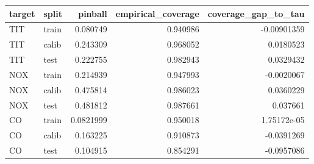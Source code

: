 \begin{tabular}{llrrr}
\toprule
target & split & pinball & empirical\_coverage & coverage\_gap\_to\_tau \\
\midrule
TIT & train & 0.080749 & 0.940986 & -0.00901359 \\
TIT & calib & 0.243309 & 0.968052 & 0.0180523 \\
TIT & test & 0.222755 & 0.982943 & 0.0329432 \\
NOX & train & 0.214939 & 0.947993 & -0.0020067 \\
NOX & calib & 0.475814 & 0.986023 & 0.0360229 \\
NOX & test & 0.481812 & 0.987661 & 0.037661 \\
CO & train & 0.0821999 & 0.950018 & 1.75172e-05 \\
CO & calib & 0.163225 & 0.910873 & -0.0391269 \\
CO & test & 0.104915 & 0.854291 & -0.0957086 \\
\bottomrule
\end{tabular}
